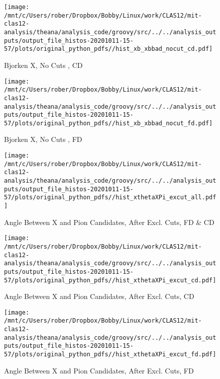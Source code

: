 \documentclass{article}
\begin{document}
\begin{landscape}
    \begin{figure}[h]
        \centering

        \texttt{[image: /mnt/c/Users/rober/Dropbox/Bobby/Linux/work/CLAS12/mit-clas12-analysis/theana/analysis\_code/groovy/src/../../analysis\_outputs/output\_file\_histos-20201011-15-57/plots/original\_python\_pdfs//hist\_xb\_xbbad\_nocut\_cd.pdf]}
        \captionsetup{textformat=empty,labelformat=blank}
        \caption{Bjorken X, No Cuts , CD}
    \end{figure}
    \clearpage
    
    \begin{figure}[h]
        \centering

        \texttt{[image: /mnt/c/Users/rober/Dropbox/Bobby/Linux/work/CLAS12/mit-clas12-analysis/theana/analysis\_code/groovy/src/../../analysis\_outputs/output\_file\_histos-20201011-15-57/plots/original\_python\_pdfs//hist\_xb\_xbbad\_nocut\_fd.pdf]}
        \captionsetup{textformat=empty,labelformat=blank}
        \caption{Bjorken X, No Cuts , FD}
    \end{figure}
    \clearpage
    
    \begin{figure}[h]
        \centering

        \texttt{[image: /mnt/c/Users/rober/Dropbox/Bobby/Linux/work/CLAS12/mit-clas12-analysis/theana/analysis\_code/groovy/src/../../analysis\_outputs/output\_file\_histos-20201011-15-57/plots/original\_python\_pdfs//hist\_xthetaXPi\_excut\_all.pdf]}
        \captionsetup{textformat=empty,labelformat=blank}
        \caption{Angle Between X and Pion Candidates, After Excl. Cuts, FD \& CD}
    \end{figure}
    \clearpage
    
    \begin{figure}[h]
        \centering

        \texttt{[image: /mnt/c/Users/rober/Dropbox/Bobby/Linux/work/CLAS12/mit-clas12-analysis/theana/analysis\_code/groovy/src/../../analysis\_outputs/output\_file\_histos-20201011-15-57/plots/original\_python\_pdfs//hist\_xthetaXPi\_excut\_cd.pdf]}
        \captionsetup{textformat=empty,labelformat=blank}
        \caption{Angle Between X and Pion Candidates, After Excl. Cuts, CD}
    \end{figure}
    \clearpage
    
    \begin{figure}[h]
        \centering

        \texttt{[image: /mnt/c/Users/rober/Dropbox/Bobby/Linux/work/CLAS12/mit-clas12-analysis/theana/analysis\_code/groovy/src/../../analysis\_outputs/output\_file\_histos-20201011-15-57/plots/original\_python\_pdfs//hist\_xthetaXPi\_excut\_fd.pdf]}
        \captionsetup{textformat=empty,labelformat=blank}
        \caption{Angle Between X and Pion Candidates, After Excl. Cuts, FD}
    \end{figure}
    \clearpage
    

\end{landscape}
\end{document}
